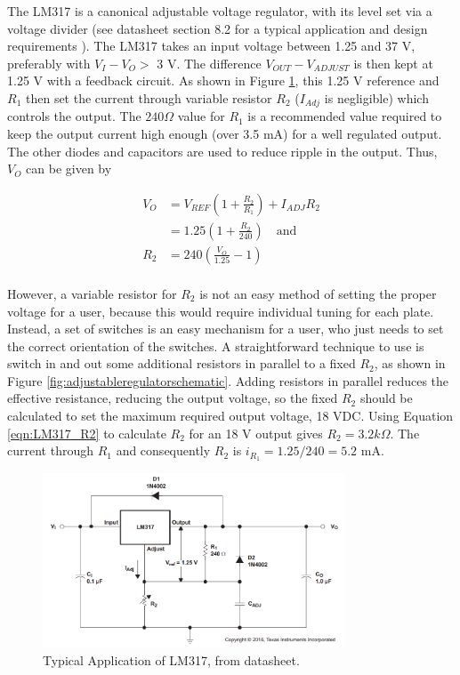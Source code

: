 \documentclass{article}
\begin{document}
		The LM317 is a canonical adjustable voltage regulator, with its level set via a voltage divider (see datasheet section 8.2 for a typical application and design requirements \cite{LM317datasheet}).  The LM317 takes an input voltage between 1.25 and 37 V, preferably with $V_I - V_O > $ 3 V.  The difference $V_{OUT} - V_{ADJUST}$ is then kept at 1.25 V with a feedback circuit.  As shown in Figure \ref{fig:LM317_typicalapp}, this 1.25 V reference and $R_1$ then set the current through variable resistor $R_2$ ($I_{Adj}$ is negligible) which controls the output.  The $240 \Omega$ value for $R_1$ is a recommended value required to keep the output current high enough (over 3.5 mA) for a well regulated output.  The other diodes and capacitors are used to reduce ripple in the output.  Thus, $V_O$ can be given by

		\begin{align}
			V_O &= V_{REF}(1 + \frac{R_2}{R_1}) + I_{ADJ}R_2 \\
			&= 1.25 (1 + \frac{R_2}{240}) \quad \text{and} \\
			R_2 &= 240 \left( \frac{V_O}{1.25} - 1 \right) \\
			\label{eqn:LM317_R2}
		\end{align}

		However, a variable resistor for $R_2$ is not an easy method of setting the proper voltage for a user, because this would require individual tuning for each plate.  Instead, a set of switches is an easy mechanism for a user, who just needs to set the correct orientation of the switches.  A straightforward technique to use is switch in and out some additional resistors in parallel to a fixed $R_2$, as shown in Figure \ref{fig:adjustableregulatorschematic}.  Adding resistors in parallel reduces the effective resistance, reducing the output voltage, so the fixed $R_2$ should be calculated to set the maximum required output voltage, 18 VDC.  Using Equation \ref{eqn:LM317_R2} to calculate $R_2$ for an 18 V output gives $R_2 = 3.2 k\Omega$. The current through $R_1$ and consequently $R_2$ is $i_{R_1} = 1.25/240 = 5.2$ mA.  

		\begin{figure}
			\centering
			\includegraphics[width = 0.8\textwidth]{PR2Images/LM317_typicalapplication}
			\caption{Typical Application of LM317, from datasheet.}
			\label{fig:LM317_typicalapp}
		\end{figure}
\end{document}
